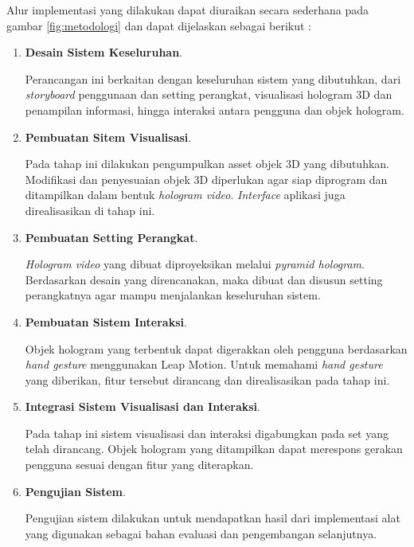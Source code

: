 	Alur implementasi yang dilakukan dapat diuraikan secara sederhana pada gambar \ref{fig:metodologi} dan dapat dijelaskan sebagai berikut :
	\begin{enumerate} [nolistsep]
		\item \textbf{Desain Sistem Keseluruhan}.
		
		Perancangan ini berkaitan dengan keseluruhan sistem yang dibutuhkan, dari \textit{storyboard} penggunaan dan setting perangkat, visualisasi hologram 3D dan penampilan informasi, hingga interaksi antara pengguna dan objek hologram.
		
		\item \textbf{Pembuatan Sitem Visualisasi}.
		
		Pada tahap ini dilakukan pengumpulkan asset objek 3D yang dibutuhkan. Modifikasi dan penyesuaian objek 3D diperlukan agar siap diprogram dan ditampilkan dalam bentuk \textit{hologram video}. \textit{Interface} aplikasi juga direalisasikan di tahap ini.
		
		\item \textbf{Pembuatan Setting Perangkat}.
		
		\textit{Hologram video} yang dibuat diproyeksikan melalui \textit{pyramid hologram}. Berdasarkan desain yang direncanakan, maka dibuat dan disusun setting perangkatnya agar mampu menjalankan keseluruhan sistem.
		
		\item \textbf{Pembuatan Sistem Interaksi}.
		
		Objek hologram yang terbentuk dapat digerakkan oleh pengguna berdasarkan \textit{hand gesture} menggunakan Leap Motion. Untuk memahami \textit{hand gesture} yang diberikan, fitur tersebut dirancang dan direalisasikan pada tahap ini.
		
		\item \textbf{Integrasi Sistem Visualisasi dan Interaksi}.
		
		Pada tahap ini sistem visualisasi dan interaksi digabungkan pada set yang telah dirancang. Objek hologram yang ditampilkan dapat merespons gerakan pengguna sesuai dengan fitur yang diterapkan.
		
		\item \textbf{Pengujian Sistem}.
		
		Pengujian sistem dilakukan untuk mendapatkan hasil dari implementasi alat yang digunakan sebagai bahan evaluasi dan pengembangan selanjutnya. 
	\end{enumerate}
\vspace{2ex}
	


